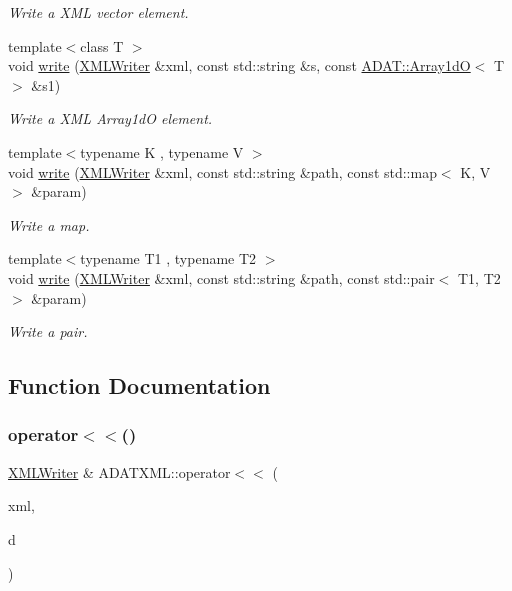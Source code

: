 \begin{DoxyCompactItemize}
\begin{DoxyCompactList}\small\item\em Write a X\+ML vector element. \end{DoxyCompactList}\item 
{\footnotesize template$<$class T $>$ }\\void \mbox{\hyperlink{group__io_ga4aca42ea47cabf4b5644cf09729343ce}{write}} (\mbox{\hyperlink{classADATXML_1_1XMLWriter}{X\+M\+L\+Writer}} \&xml, const std\+::string \&s, const \mbox{\hyperlink{classADAT_1_1Array1dO}{A\+D\+A\+T\+::\+Array1dO}}$<$ T $>$ \&s1)
\begin{DoxyCompactList}\small\item\em Write a X\+ML Array1dO element. \end{DoxyCompactList}\item 
{\footnotesize template$<$typename K , typename V $>$ }\\void \mbox{\hyperlink{group__io_gaab13ff0d8972a4435cd3590b6c87ea05}{write}} (\mbox{\hyperlink{classADATXML_1_1XMLWriter}{X\+M\+L\+Writer}} \&xml, const std\+::string \&path, const std\+::map$<$ K, V $>$ \&param)
\begin{DoxyCompactList}\small\item\em Write a map. \end{DoxyCompactList}\item 
{\footnotesize template$<$typename T1 , typename T2 $>$ }\\void \mbox{\hyperlink{group__io_gabcda0d5bebd682903ae663861766df8b}{write}} (\mbox{\hyperlink{classADATXML_1_1XMLWriter}{X\+M\+L\+Writer}} \&xml, const std\+::string \&path, const std\+::pair$<$ T1, T2 $>$ \&param)
\begin{DoxyCompactList}\small\item\em Write a pair. \end{DoxyCompactList}\end{DoxyCompactItemize}


\subsection{Function Documentation}
\mbox{\label{namespaceADATXML_a83bf96b9b273ac7b48f1f7eef49b5390}} 
\subsubsection{\texorpdfstring{operator$<$$<$()}{operator<<()}}
{\footnotesize\ttfamily \mbox{\hyperlink{classADATXML_1_1XMLWriter}{X\+M\+L\+Writer}} \& A\+D\+A\+T\+X\+M\+L\+::operator$<$$<$ (\begin{DoxyParamCaption}\item[{\mbox{\hyperlink{classADATXML_1_1XMLWriter}{X\+M\+L\+Writer}} \&}]{xml,  }\item[{const string \&}]{d }\end{DoxyParamCaption})}

